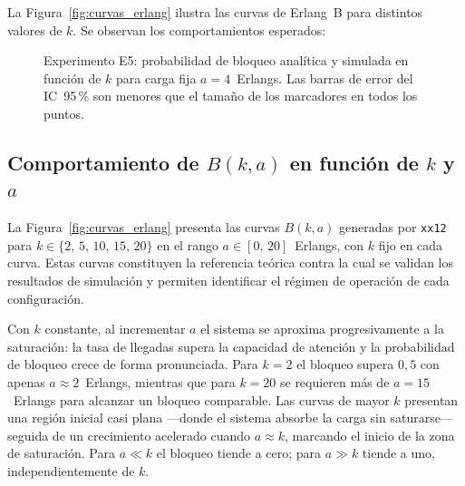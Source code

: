 \documentclass[12pt,a4paper]{article}
\theoremstyle{definition}
\theoremstyle{plain}
\theoremstyle{remark}
\begin{document}
La Figura~\ref{fig:curvas_erlang} ilustra las curvas de Erlang~B para distintos valores de
$k$.
Se observan los comportamientos esperados:

\begin{figure}[H]
\centering
{}
\caption{Experimento E5: probabilidad de bloqueo analítica y simulada en función
de $k$ para carga fija $a=4$~Erlangs.
Las barras de error del IC~95\,\% son menores que el tamaño de los marcadores
en todos los puntos.}
\label{fig:E5_k_sweep}
\end{figure}

\subsection*{\texorpdfstring{Comportamiento de $B(k,a)$ en función de $k$ y $a$}
                             {Comportamiento de B(k,a) en funcion de k y a}}

La Figura~\ref{fig:curvas_erlang} presenta las curvas $B(k,a)$ generadas por
\texttt{xx12} para $k \in \{2,\,5,\,10,\,15,\,20\}$ en el rango
$a \in [0,\,20]$~Erlangs, con $k$ fijo en cada curva.
Estas curvas constituyen la referencia teórica contra la cual se validan los
resultados de simulación y permiten identificar el régimen de operación de
cada configuración.

Con $k$ constante, al incrementar $a$ el sistema se aproxima progresivamente
a la saturación: la tasa de llegadas supera la capacidad de atención y la
probabilidad de bloqueo crece de forma pronunciada.
Para $k=2$ el bloqueo supera $0{,}5$ con apenas $a \approx 2$~Erlangs, mientras
que para $k=20$ se requieren más de $a = 15$~Erlangs para alcanzar un bloqueo
comparable.
Las curvas de mayor $k$ presentan una región inicial casi plana —donde el sistema
absorbe la carga sin saturarse— seguida de un crecimiento acelerado cuando
$a \approx k$, marcando el inicio de la zona de saturación.
Para $a \ll k$ el bloqueo tiende a cero; para $a \gg k$ tiende a uno,
independientemente de $k$.
\end{document}

